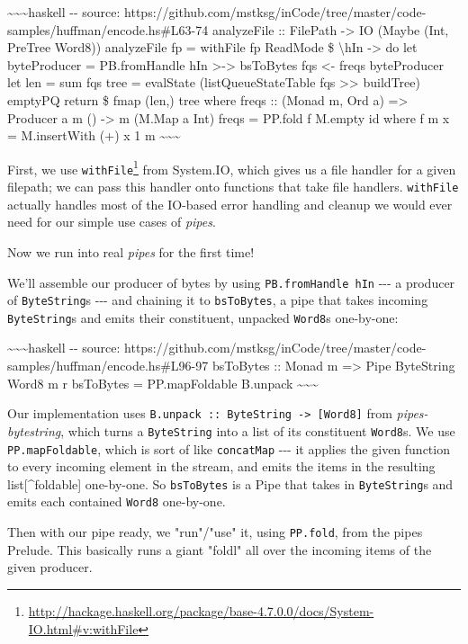 \documentclass[]{article}
\renewcommand{\href}[2]{#2\footnote{\url{#1}}}
\begin{document}
\textasciitilde{}\textasciitilde{}\textasciitilde{}haskell -\/- source:
https://github.com/mstksg/inCode/tree/master/code-samples/huffman/encode.hs\#L63-74
analyzeFile :: FilePath -\textgreater{} IO (Maybe (Int, PreTree Word8))
analyzeFile fp = withFile fp ReadMode \$ \textbackslash{}hIn -\textgreater{} do
let byteProducer = PB.fromHandle hIn \textgreater{}-\textgreater{} bsToBytes fqs
\textless{}- freqs byteProducer let len = sum fqs tree = evalState
(listQueueStateTable fqs \textgreater{}\textgreater{} buildTree) emptyPQ return
\$ fmap (len,) tree where freqs :: (Monad m, Ord a) =\textgreater{} Producer a m
() -\textgreater{} m (M.Map a Int) freqs = PP.fold f M.empty id where f m x =
M.insertWith (+) x 1 m \textasciitilde{}\textasciitilde{}\textasciitilde{}

First, we use
\href{http://hackage.haskell.org/package/base-4.7.0.0/docs/System-IO.html\#v:withFile}{\texttt{withFile}}
from System.IO, which gives us a file handler for a given filepath; we can pass
this handler onto functions that take file handlers. \texttt{withFile} actually
handles most of the IO-based error handling and cleanup we would ever need for
our simple use cases of \emph{pipes}.

Now we run into real \emph{pipes} for the first time!

We'll assemble our producer of bytes by using \texttt{PB.fromHandle\ hIn}
-\/-\/- a producer of \texttt{ByteString}s -\/-\/- and chaining it to
\texttt{bsToBytes}, a pipe that takes incoming \texttt{ByteString}s and emits
their constituent, unpacked \texttt{Word8}s one-by-one:

\textasciitilde{}\textasciitilde{}\textasciitilde{}haskell -\/- source:
https://github.com/mstksg/inCode/tree/master/code-samples/huffman/encode.hs\#L96-97
bsToBytes :: Monad m =\textgreater{} Pipe ByteString Word8 m r bsToBytes =
PP.mapFoldable B.unpack \textasciitilde{}\textasciitilde{}\textasciitilde{}

Our implementation uses
\texttt{B.unpack\ ::\ ByteString\ -\textgreater{}\ {[}Word8{]}} from
\emph{pipes-bytestring}, which turns a \texttt{ByteString} into a list of its
constituent \texttt{Word8}s. We use \texttt{PP.mapFoldable}, which is sort of
like \texttt{concatMap} -\/-\/- it applies the given function to every incoming
element in the stream, and emits the items in the resulting
list{[}\^{}foldable{]} one-by-one. So \texttt{bsToBytes} is a Pipe that takes in
\texttt{ByteString}s and emits each contained \texttt{Word8} one-by-one.

Then with our pipe ready, we "run"/"use" it, using \texttt{PP.fold}, from the
pipes Prelude. This basically runs a giant "foldl" all over the incoming items
of the given producer.
\end{document}
